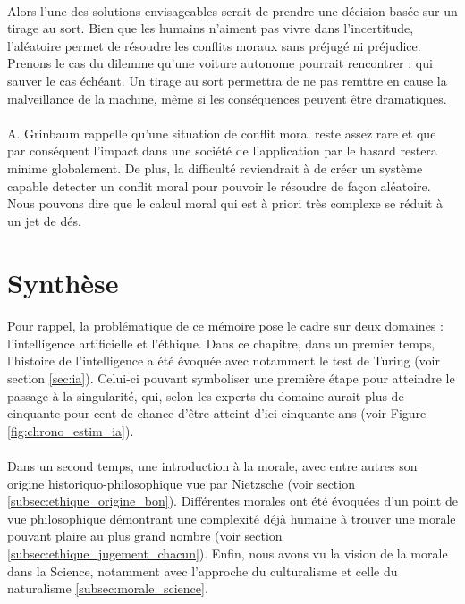 \documentclass[10pt, french, a4paper]{report}
\begin{document}
\paragraph{}
Alors l'une des solutions envisageables serait de prendre une décision basée sur un tirage au sort. Bien que les humains n'aiment pas vivre dans l'incertitude, l'aléatoire permet de résoudre les conflits moraux sans préjugé ni préjudice. Prenons le cas du dilemme qu'une voiture autonome pourrait rencontrer : qui sauver le cas échéant. Un tirage au sort permettra de ne pas remttre en cause la malveillance de la machine, même si les conséquences peuvent être dramatiques.

\paragraph{}
A. Grinbaum rappelle qu'une situation de conflit moral reste assez rare et que par conséquent l'impact dans une société de l'application par le hasard restera minime globalement. De plus, la difficulté reviendrait à de créer un système capable detecter un conflit moral pour pouvoir le résoudre de façon aléatoire. Nous pouvons dire que le calcul moral qui est à priori très complexe se réduit à un jet de dés.

\section{Synthèse}

\paragraph{}
Pour rappel, la problématique de ce mémoire pose le cadre sur deux domaines : l’intelligence artificielle et l’éthique. Dans ce chapitre, dans un premier temps, l’histoire de l’intelligence a été évoquée avec notamment le test de Turing (voir section \ref{sec:ia}). Celui-ci pouvant symboliser une première étape pour atteindre le passage à la singularité, qui, selon les experts du domaine aurait plus de cinquante pour cent de chance d’être atteint d’ici cinquante ans (voir Figure \ref{fig:chrono_estim_ia}).

\paragraph{}
Dans un second temps, une introduction à la morale, avec entre autres son origine historiquo-philosophique vue par Nietzsche (voir section \ref{subsec:ethique_origine_bon}). Différentes morales ont été évoquées d’un point de vue philosophique démontrant une complexité déjà humaine à trouver une morale pouvant plaire au plus grand nombre (voir section \ref{subsec:ethique_jugement_chacun}). Enfin, nous avons vu la vision de la morale dans la Science, notamment avec l'approche du culturalisme et celle du naturalisme \ref{subsec:morale_science}.
\end{document}
